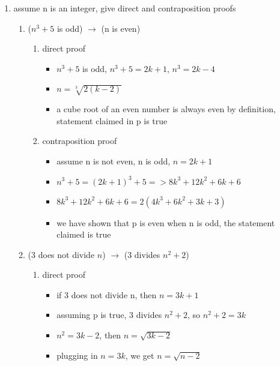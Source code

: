 \documentclass[12pt]{article}
\begin{document}
    \begin{enumerate}

        \item assume n is an integer, give direct and contraposition proofs
        \begin{enumerate}
            \item ($n^3 + 5$ is odd) $ \rightarrow $ (n is even)
            \begin{enumerate}
                \item direct proof
                \begin{itemize}
                    \item $n^3 + 5$ is odd, $n^3 + 5 = 2k + 1$, $n^3 = 2k -4$
                    \item $n = \sqrt[3]{2(k-2)}$
                    \item a cube root of an even number is always even by definition, statement claimed in p is true
                \end{itemize}
                \item contraposition proof
                \begin{itemize}
                    \item assume n is not even, n is odd, $n = 2k + 1$
                    \item $n^3 + 5 = (2k+1)^3 + 5 => 8k^3 + 12k^2 + 6k + 6$
                    \item $8k^3 + 12k^2 + 6k + 6 = 2(4k^3 + 6k^2 + 3k + 3)$
                    \item we have shown that p is even when n is odd, the statement claimed is true 
                \end{itemize}
            \end{enumerate}
            \item (3 does not divide $n$) $ \rightarrow $ (3 divides $n^2 + 2$)
            \begin{enumerate}
                \item direct proof
                \begin{itemize}
                    \item if 3 does not divide n, then $n = 3k + 1$
                    \item assuming p is true, 3 divides $n^2 + 2$, so $n^2 + 2 = 3k$
                    \item $n^2 = 3k-2$, then $n = \sqrt{3k-2}$
                    \item plugging in $n = 3k$, we get $n = \sqrt{n-2}$

\end{itemize}
\end{enumerate}
\end{enumerate}
\end{enumerate}
\end{document}
